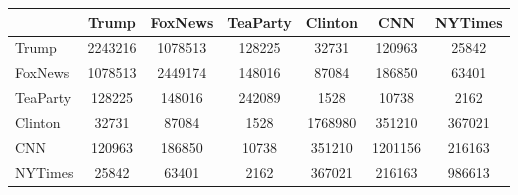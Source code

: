 \begin{tabular}{l*6{S[table-format=7.0]}}
  \toprule
  & {Trump} & {FoxNews} & {TeaParty} & {Clinton} & {CNN} & {NYTimes} \\ 
  \midrule
  Trump & 2243216 & 1078513 & 128225 & 32731 & 120963 & 25842 \\ 
  FoxNews & 1078513 & 2449174 & 148016 & 87084 & 186850 & 63401 \\ 
  TeaParty & 128225 & 148016 & 242089 & 1528 & 10738 & 2162 \\ 
  Clinton & 32731 & 87084 & 1528 & 1768980 & 351210 & 367021 \\ 
  CNN & 120963 & 186850 & 10738 & 351210 & 1201156 & 216163 \\ 
  NYTimes & 25842 & 63401 & 2162 & 367021 & 216163 & 986613 \\ 
  \bottomrule
\end{tabular}